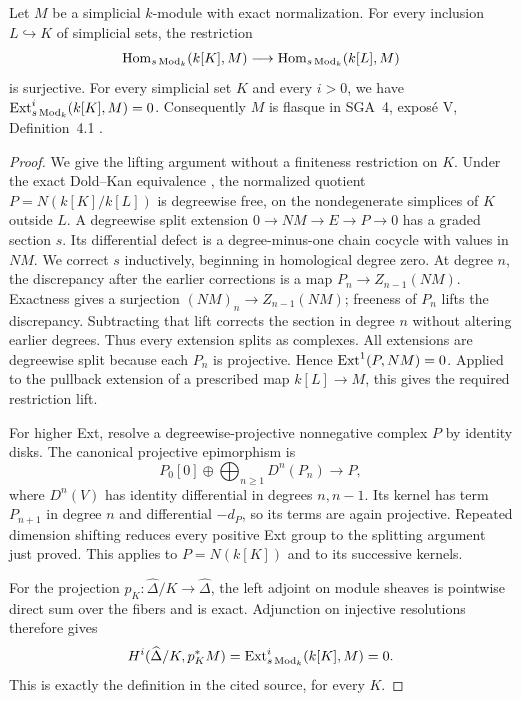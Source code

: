 \begin{lemma}
\label{A001}
Let $M$ be a simplicial $k$-module with exact normalization. For every
inclusion $L\hookrightarrow K$ of simplicial sets, the restriction
\[
 \operatorname{Hom}_{s\operatorname{Mod}_k}(k[K],M)
 \longrightarrow \operatorname{Hom}_{s\operatorname{Mod}_k}(k[L],M)
\]
is surjective. For every simplicial set $K$ and every $i>0$, we have
$\operatorname{Ext}^i_{s\operatorname{Mod}_k}(k[K],M)=0$.
Consequently $M$ is flasque in SGA~4, expos\'e V, Definition~4.1
\cite{Root_SGA4}.
\end{lemma}
\begin{proof}
We give the lifting argument without a finiteness restriction on $K$.
Under the exact Dold--Kan equivalence
\cite[Theorem 14.24.3]{Root_DoldKan}, the normalized quotient
$P=N(k[K]/k[L])$ is degreewise free, on the nondegenerate simplices of
$K$ outside $L$. A degreewise split extension
$0\to NM\to E\to P\to0$ has a graded section $s$. Its differential
defect is a degree-minus-one chain cocycle with values in $NM$.
We correct $s$ inductively, beginning in homological degree zero.
At degree $n$, the discrepancy after the earlier corrections is a
map $P_n\to Z_{n-1}(NM)$. Exactness gives a surjection
$(NM)_n\to Z_{n-1}(NM)$; freeness of $P_n$ lifts the discrepancy.
Subtracting that lift corrects the section in degree $n$ without
altering earlier degrees. Thus every extension splits as complexes.
All extensions are degreewise split because each $P_n$ is projective.
Hence $\operatorname{Ext}^1(P,NM)=0$. Applied to the pullback extension of a
prescribed map $k[L]\to M$, this gives the required restriction lift.

For higher Ext, resolve a degreewise-projective nonnegative complex
$P$ by identity disks. The canonical projective epimorphism is
\[
 P_0[0]\oplus\bigoplus_{n\geq1}D^n(P_n)\longrightarrow P,
\]
where $D^n(V)$ has identity differential in degrees $n,n-1$.
Its kernel has term $P_{n+1}$ in degree $n$ and differential $-d_P$,
so its terms are again projective. Repeated dimension shifting reduces
every positive Ext group to the splitting argument just proved.
This applies to $P=N(k[K])$ and to its successive kernels.

For the projection $p_K:\widehat\Delta/K\to\widehat\Delta$, the
left adjoint on module sheaves is pointwise direct sum over the fibers
and is exact. Adjunction on injective resolutions therefore gives
\[
 H^i(\widehat\Delta/K,p_K^*M)
 =\operatorname{Ext}^i_{s\operatorname{Mod}_k}(k[K],M)=0.
\]
This is exactly the definition in the cited source, for every $K$.
\end{proof}

